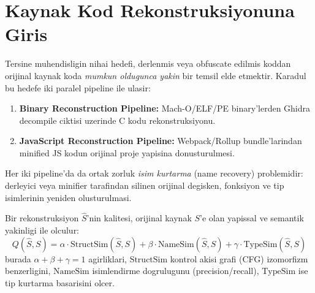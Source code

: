 

%
%

\section{Kaynak Kod Rekonstruksiyonuna Giris}
\label{sec:recon-giris}

Tersine muhendisligin nihai hedefi, derlenmis veya obfuscate edilmis koddan
orijinal kaynak koda \emph{mumkun oldugunca yakin} bir temsil elde etmektir.
Karadul bu hedefe iki paralel pipeline ile ulasir:

\begin{enumerate}
  \item \textbf{Binary Reconstruction Pipeline:} Mach-O/ELF/PE binary'lerden
        Ghidra decompile ciktisi uzerinde C kodu rekonstruksiyonu.
  \item \textbf{JavaScript Reconstruction Pipeline:} Webpack/Rollup bundle'larindan
        minified JS kodun orijinal proje yapisina donusturulmesi.
\end{enumerate}

Her iki pipeline'da da ortak zorluk \emph{isim kurtarma} (name recovery)
problemidir: derleyici veya minifier tarafindan silinen orijinal degisken,
fonksiyon ve tip isimlerinin yeniden olusturulmasi.

\begin{tanim}
Bir rekonstruksiyon $\hat{S}$'nin kalitesi, orijinal kaynak $S$'e olan
yapissal ve semantik yakinligi ile olculur:
\begin{equation}
  Q(\hat{S}, S) = \alpha \cdot \text{StructSim}(\hat{S}, S)
                + \beta \cdot \text{NameSim}(\hat{S}, S)
                + \gamma \cdot \text{TypeSim}(\hat{S}, S)
  \label{eq:recon-quality}
\end{equation}
burada $\alpha + \beta + \gamma = 1$ agirliklari,
$\text{StructSim}$ kontrol akisi grafi (CFG) izomorfizm benzerligini,
$\text{NameSim}$ isimlendirme dogru\-lugunu (precision/recall),
$\text{TypeSim}$ ise tip kurtarma basar\-isini olcer.
\end{tanim}


